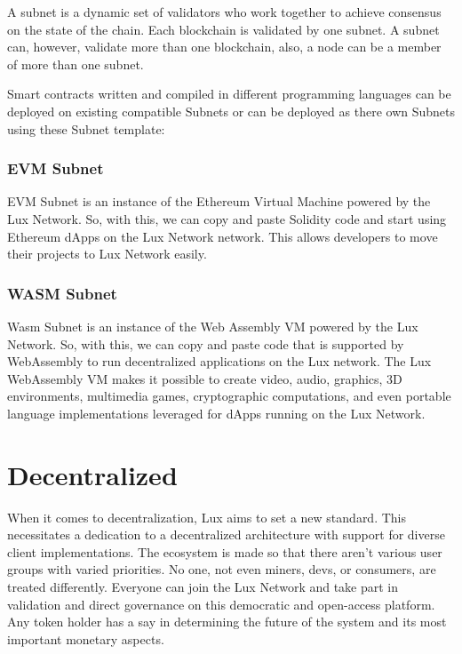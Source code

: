 \documentclass[11pt]{article}
\begin{document}
A subnet is a dynamic set of validators who work together to achieve consensus on the state of the chain. Each blockchain is validated by one subnet. A subnet can, however, validate more than one blockchain, also, a node can be a member of more than one subnet.


Smart contracts written and compiled in different programming languages can be deployed  on existing compatible Subnets or can be deployed as there own Subnets using these  Subnet template:


\subsubsection{EVM Subnet}

EVM Subnet is an instance of the Ethereum Virtual Machine powered by the Lux Network. So, with this, we can copy and paste Solidity code and start using Ethereum dApps on the Lux Network network. This allows developers to move their projects to Lux Network easily.


\subsubsection{WASM Subnet}

Wasm Subnet is an instance of the Web Assembly VM powered by the Lux Network. So, with this, we can copy and paste code that is supported by WebAssembly to run decentralized applications on the Lux network. The Lux WebAssembly VM makes it possible to create video, audio, graphics, 3D environments, multimedia games, cryptographic computations, and even portable language implementations leveraged for dApps running on the Lux Network.


\section{Decentralized}

When it comes to decentralization, Lux aims to set a new standard. This necessitates a dedication to a decentralized architecture with support for diverse client implementations. The ecosystem is made so that there aren't various user groups with varied priorities. No one, not even miners, devs, or consumers, are treated differently. Everyone can join the Lux Network and take part in validation and direct governance on this democratic and open-access platform. Any token holder has a say in determining the future of the system and its most important monetary aspects.
\end{document}
